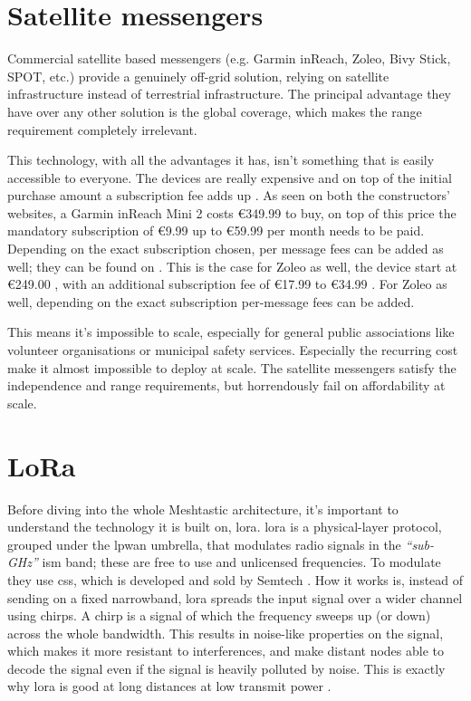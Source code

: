 \section{Satellite messengers}%
\label{sec:sota-satellite}

Commercial satellite based messengers (e.g. Garmin inReach, Zoleo, Bivy Stick, SPOT, etc.) provide a genuinely off-grid solution, relying on satellite infrastructure instead of terrestrial infrastructure. 
The principal advantage they have over any other solution is the global coverage, which makes the range requirement completely irrelevant.

This technology, with all the advantages it has, isn't something that is easily accessible to everyone. The devices are really expensive and on top of the initial purchase amount a subscription fee adds up \autocite{GarminInReach2026, Zoleo2026}.
As seen on both the constructors' websites, a Garmin inReach Mini 2 costs \euro{}349.99 \autocite{GarminInReachMini22026} to buy, on top of this price the mandatory subscription of \euro{}9.99 up to \euro{}59.99 per month \autocite{GarminInReach2026} needs to be paid. Depending on the exact subscription chosen, per message fees can be added as well; they can be found on \textcite{GarminInReach2026}.
This is the case for Zoleo as well, the device start at \euro{}249.00 \autocite{ZoleoProducts2026}, with an additional subscription fee of \euro{}17.99 to \euro{}34.99 \autocite{Zoleo2026}. For Zoleo as well, depending on the exact subscription per-message fees can be added. 

This means it's impossible to scale, especially for general public associations like volunteer organisations or municipal safety services. Especially the recurring cost make it almost impossible to deploy at scale.
The satellite messengers satisfy the independence and range requirements, but horrendously fail on affordability at scale.

\section{LoRa}%
\label{sec:sota-lora}

Before diving into the whole Meshtastic architecture, it's important to understand the technology it is built on, \gls{lora}.
\gls{lora} is a physical-layer protocol, grouped under the \gls{lpwan} umbrella, that modulates radio signals in the \emph{``sub-GHz''} \gls{ism} band; these are free to use and unlicensed frequencies. To modulate they use \gls{css}, which is developed and sold by Semtech \autocite{Raza2017LPWAN}.
How it works is, instead of sending on a fixed narrowband, \gls{lora} spreads the input signal over a wider channel using chirps. A chirp is a signal of which the frequency sweeps up (or down) across the whole bandwidth.
This results in noise-like properties on the signal, which makes it more resistant to interferences, and make distant nodes able to decode the signal even if the signal is heavily polluted by noise.
This is exactly why \gls{lora} is good at long distances at low transmit power \autocite{Raza2017LPWAN}.

